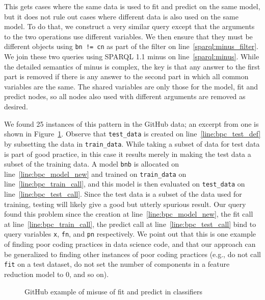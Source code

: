 This gets cases where the same data is used to fit and predict on the same model, but it does not rule out cases where different data is also used on the same model.  To do that, we construct a very similar query except that the arguments to the two operations use different variables.  We then ensure that they must be different objects using {\tt bn != cn} as part of the filter on line~\ref{sparql:minus_filter}.  We join these two queries using SPARQL 1.1 minus on line~\ref{sparql:minus}.  While the detailed semantics of minus is complex, the key is that any answer to the first part is removed if there is any answer to the second part in which all common variables are the same.  The shared variables are only those for the model, fit and predict nodes, so all nodes also used with different arguments are removed as desired.

\begin{figure*}[htb]
\begin{centering}

\caption{SPARQL query to detect misuse of fit and predict in classifiers}
\label{code:bad_pattern_sparql}
\end{centering}
\end{figure*}

 We found 25 instances of this pattern in the GitHub data; an excerpt from one is shown in Figure~\ref{code:bad_pattern_code}.  Observe that {\tt test\_data} is created on line~\ref{line:bpc_test_def} by subsetting the data in {\tt train\_data}.  While taking a subset of data for test data is part of good practice, in this case it results merely in making the test data a subset of the training data.  A model {\tt bnb} is allocated on line~\ref{line:bpc_model_new} and trained on {\tt train\_data} on line~\ref{line:bpc_train_call}, and this model is then evaluated on {\tt test\_data} on line~\ref{line:bpc_test_call}.  Since the test data is a subset of the data used for training, testing will likely give a good but utterly spurious result.  Our query found this problem since the creation at line~\ref{line:bpc_model_new}, the fit call at line~\ref{line:bpc_train_call}, the predict call at line~\ref{line:bpc_test_call} bind to query variables {\tt x}, {\tt fn}, and {\tt pn} respectively.  We point out that this is one example of finding poor coding practices in data science code, and that our approach can be generalized to finding other instances of poor coding practices (e.g., do not call {\tt fit} on a test dataset, do not set the number of components in a feature reduction model to 0, and so on).

\begin{figure}[htb]
\begin{centering}

\caption{GitHub example of misuse of fit and predict in classifiers}
\label{code:bad_pattern_code}
\end{centering}
\end{figure}

